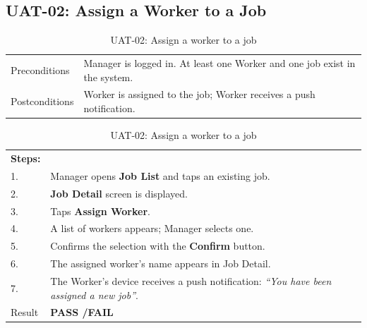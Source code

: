 \subsection*{UAT-02: Assign a Worker to a Job}
\begin{table}[H]
  \centering
  \begin{tabularx}{\textwidth}{lX}
    \toprule
    Preconditions  & Manager is logged in. At least one Worker and one job exist in the system. \\
    Postconditions & Worker is assigned to the job; Worker receives a push notification. \\
    \midrule
  \end{tabularx}
  \begin{tabularx}{\textwidth}{lX}
    \textbf{Steps:} & \\
    1. & Manager opens \textbf{Job List} and taps an existing job. \\
    2. & \textbf{Job Detail} screen is displayed. \\
    3. & Taps \textbf{Assign Worker}. \\
    4. & A list of workers appears; Manager selects one. \\
    5. & Confirms the selection with the \textbf{Confirm} button. \\
    6. & The assigned worker's name appears in Job Detail. \\
    7. & The Worker's device receives a push notification: \textit{``You have been assigned a new job''}. \\
    \midrule
    Result & \textbf{PASS \quad/\quad FAIL} \\
    \bottomrule
  \end{tabularx}
  \caption{UAT-02: Assign a worker to a job}
\end{table}

